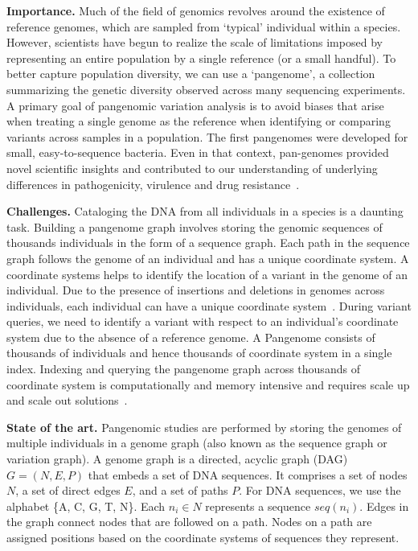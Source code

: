 \noindent
\textbf{Importance.}
Much of the field of genomics revolves around the existence of reference genomes, which are sampled from `typical' individual within a species.  However, scientists have begun to realize the scale of limitations imposed by representing an entire population by a single reference (or a small handful). To better capture population diversity, we can use a `pangenome', a collection summarizing the genetic diversity observed across many sequencing experiments.
A primary goal of pangenomic variation analysis is to avoid biases that arise when treating a single genome as the reference when identifying or comparing variants across samples in a population.  The first pangenomes were developed for small, easy-to-sequence bacteria. Even in that context, pan-genomes provided novel scientific insights and contributed to our understanding of underlying differences in pathogenicity, virulence and drug resistance~\cite{sherman2020pan}.

\noindent
\textbf{Challenges.}
Cataloging the DNA from all individuals in a species is a daunting task.
Building a pangenome graph involves storing the genomic sequences of thousands individuals in the form of a sequence graph. Each path in the sequence graph follows the genome of an individual and has a unique coordinate system. A coordinate systems helps to identify the location of a variant in the genome of an individual. Due to the presence of insertions and deletions in genomes across individuals, each individual can have a unique coordinate system~\cite{pandey2021variantstore}.
During variant queries, we need to identify a variant with respect to an individual's coordinate system due to the absence of a reference genome.
A Pangenome consists of thousands of individuals and hence thousands of coordinate system in a single index. Indexing and querying the pangenome graph across thousands of coordinate system is computationally and memory intensive and requires scale up and scale out solutions~\cite{garrison2018variation,pandey2021variantstore}.

\noindent
\textbf{State of the art.}
Pangenomic studies are performed by storing the genomes of multiple individuals in a genome graph (also known as the sequence graph or variation graph). A genome graph is a directed, acyclic graph (DAG) $G = (N, E, P)$ that embeds a set of DNA sequences. It comprises a set of nodes $N$, a set of direct edges $E$, and a set of paths $P$. For DNA sequences, we use the alphabet \{A, C, G, T, N\}\@. Each $n_i \in N$ represents a sequence $seq(n_i)$. Edges in the graph connect nodes that are followed on a path. Nodes on a path are assigned positions based on the coordinate systems of sequences they represent.

